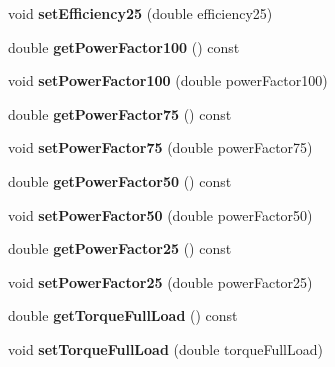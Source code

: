 \begin{DoxyCompactItemize}
\mbox{\label{class_motor_data_a89d6e254b34ba81f80b756bb51cd66f6}} 
void {\bfseries set\+Efficiency25} (double efficiency25)
\item 
\mbox{\label{class_motor_data_a250e44c87517fe1ac4b127db48b07300}} 
double {\bfseries get\+Power\+Factor100} () const
\item 
\mbox{\label{class_motor_data_a8bbfc74cd323a44ea8aa5453e3cd4895}} 
void {\bfseries set\+Power\+Factor100} (double power\+Factor100)
\item 
\mbox{\label{class_motor_data_a47bd751614504069a1cc0792be5f6105}} 
double {\bfseries get\+Power\+Factor75} () const
\item 
\mbox{\label{class_motor_data_a8cb9fb1696d9d28ad65f7d1e27128d7f}} 
void {\bfseries set\+Power\+Factor75} (double power\+Factor75)
\item 
\mbox{\label{class_motor_data_ac154d54db217e67590e9fdc4ec40b628}} 
double {\bfseries get\+Power\+Factor50} () const
\item 
\mbox{\label{class_motor_data_a9fa35a7a40a0f9b96d1d9dad8dcf9a43}} 
void {\bfseries set\+Power\+Factor50} (double power\+Factor50)
\item 
\mbox{\label{class_motor_data_acf9931c536b579c9f8700411e74456db}} 
double {\bfseries get\+Power\+Factor25} () const
\item 
\mbox{\label{class_motor_data_abf58c754c83b355e9b478401a441c4a2}} 
void {\bfseries set\+Power\+Factor25} (double power\+Factor25)
\item 
\mbox{\label{class_motor_data_a34d236d6b1ef4228e7dd0784bbd0245d}} 
double {\bfseries get\+Torque\+Full\+Load} () const
\item 
\mbox{\label{class_motor_data_a38e1656c9bdf7fda71bb38c8f84081db}} 
void {\bfseries set\+Torque\+Full\+Load} (double torque\+Full\+Load)
\item 
\mbox{\label{class_motor_data_a03eba622bcd69dc052e3627e00a8b6a3}} 

\end{DoxyCompactItemize}
